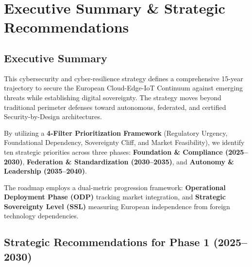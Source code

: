 \documentclass[12pt,a4paper]{report}
\begin{document}
\newpage
\section{Executive Summary \& Strategic Recommendations}

\subsection*{Executive Summary}
This cybersecurity and cyber-resilience strategy defines a comprehensive 15-year trajectory to secure the European Cloud-Edge-IoT Continuum against emerging threats while establishing digital sovereignty. The strategy moves beyond traditional perimeter defenses toward autonomous, federated, and certified Security-by-Design architectures.

By utilizing a \textbf{4-Filter Prioritization Framework} (Regulatory Urgency, Foundational Dependency, Sovereignty Cliff, and Market Feasibility), we identify ten strategic priorities across three phases: \textbf{Foundation \& Compliance (2025--2030)}, \textbf{Federation \& Standardization (2030--2035)}, and \textbf{Autonomy \& Leadership (2035--2040)}.

The roadmap employs a dual-metric progression framework: \textbf{Operational Deployment Phase (ODP)} tracking market integration, and \textbf{Strategic Sovereignty Level (SSL)} measuring European independence from foreign technology dependencies.

\subsection*{Strategic Recommendations for Phase 1 (2025--2030)}
\end{document}
